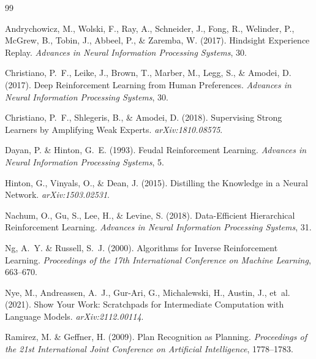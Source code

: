 \documentclass[12pt, a4paper]{article}
\begin{document}
\bigskip
\begin{thebibliography}{99}

Andrychowicz, M., Wolski, F., Ray, A., Schneider, J., Fong, R., Welinder, P., McGrew, B., Tobin, J., Abbeel, P., \& Zaremba, W. (2017).
Hindsight Experience Replay.
\textit{Advances in Neural Information Processing Systems}, 30.

Christiano, P.~F., Leike, J., Brown, T., Marber, M., Legg, S., \& Amodei, D. (2017).
Deep Reinforcement Learning from Human Preferences.
\textit{Advances in Neural Information Processing Systems}, 30.

Christiano, P.~F., Shlegeris, B., \& Amodei, D. (2018).
Supervising Strong Learners by Amplifying Weak Experts.
\textit{arXiv:1810.08575}.

Dayan, P. \& Hinton, G.~E. (1993).
Feudal Reinforcement Learning.
\textit{Advances in Neural Information Processing Systems}, 5.

Hinton, G., Vinyals, O., \& Dean, J. (2015).
Distilling the Knowledge in a Neural Network.
\textit{arXiv:1503.02531}.

Nachum, O., Gu, S., Lee, H., \& Levine, S. (2018).
Data-Efficient Hierarchical Reinforcement Learning.
\textit{Advances in Neural Information Processing Systems}, 31.

Ng, A.~Y. \& Russell, S.~J. (2000).
Algorithms for Inverse Reinforcement Learning.
\textit{Proceedings of the 17th International Conference on Machine Learning}, 663--670.

Nye, M., Andreassen, A.~J., Gur-Ari, G., Michalewski, H., Austin, J., et~al. (2021).
Show Your Work: Scratchpads for Intermediate Computation with Language Models.
\textit{arXiv:2112.00114}.

Ramirez, M. \& Geffner, H. (2009).
Plan Recognition as Planning.
\textit{Proceedings of the 21st International Joint Conference on Artificial Intelligence}, 1778--1783.


\end{thebibliography}
\end{document}
